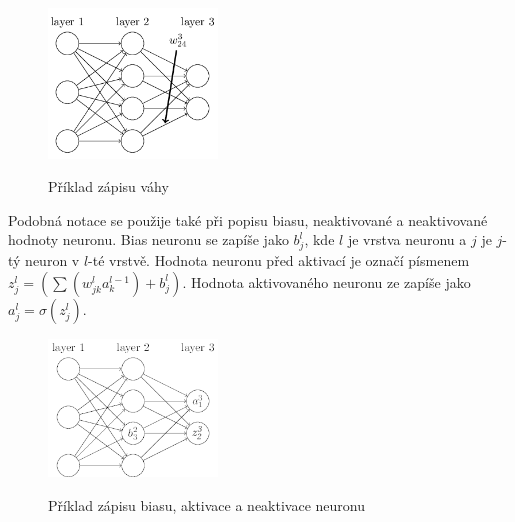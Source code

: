 \begin{figure}[h]
    \centering
    \includegraphics[width=0.4\textwidth]{images/vaha_v_siti.png}
    \caption{Příklad zápisu váhy}\cite{vaha_v_siti}
\end{figure}

Podobná notace se použije také při popisu biasu, neaktivované a neaktivované hodnoty neuronu.
Bias neuronu se zapíše jako \(b_{j}^l\), kde \(l\) je vrstva neuronu a \(j\) je \(j\)-tý neuron v \(l\)-té vrstvě.
Hodnota neuronu před aktivací je označí písmenem \(z_{j}^{l} = \left( \sum (w^{l}_{jk} a^{l-1}_k) + b^l_j \right)\).
Hodnota aktivovaného neuronu ze zapíše jako \(a_j^l = \sigma(z_j^l)\).

\begin{figure}[h]
    \centering
    \includegraphics[width=0.4\textwidth]{images/bias_a_neuron.png}
    \caption{Příklad zápisu biasu, aktivace a neaktivace neuronu} \cite{bias_a_neuron}
\end{figure}

